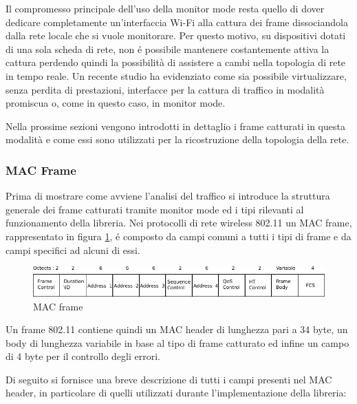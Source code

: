 Il compromesso principale dell'uso della monitor mode resta quello di dover dedicare completamente un'interfaccia Wi-Fi alla cattura dei frame dissociandola dalla rete locale che si vuole monitorare.
Per questo motivo, su dispositivi dotati di una sola scheda di rete, non \'e possibile mantenere costantemente attiva la cattura perdendo quindi la possibilit\`a di assistere a cambi nella topologia di rete in tempo reale. 
Un recente studio \cite{zanetti2010non} ha evidenziato come sia possibile virtualizzare, senza perdita di prestazioni, interfacce per la cattura di traffico in modalit\`a promiscua o, come in questo caso, in monitor mode.

Nella prossime sezioni vengono introdotti in dettaglio i frame catturati in questa modalit\`a e come essi sono utilizzati per la ricostruzione della topologia della rete.

\subsubsection{MAC Frame}

Prima di mostrare come avviene l'analisi del traffico si introduce la struttura generale dei frame catturati tramite monitor mode ed i tipi rilevanti al funzionamento della libreria.
Nei protocolli di rete wireless 802.11 un MAC frame, rappresentato in figura \ref{fig:macframe}, \'e composto da campi comuni a tutti i tipi di frame e da campi specifici ad alcuni di essi.

\begin{figure}[!htb]
	\centering
	\includegraphics{images/img5.pdf}
	\caption{MAC frame}
	\label{fig:macframe}
\end{figure}

Un frame 802.11 contiene quindi un MAC header di lunghezza pari a 34 byte, un body di lunghezza variabile in base al tipo di frame catturato ed infine un campo di 4 byte per il controllo degli errori.

Di seguito si fornisce una breve descrizione di tutti i campi presenti nel MAC header, in particolare di quelli utilizzati durante l'implementazione della libreria:

\newpage

